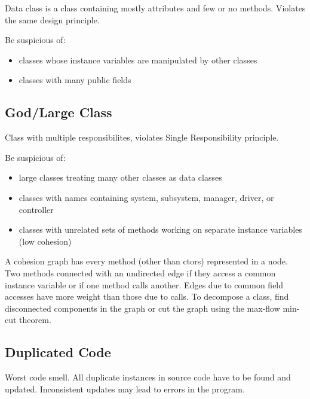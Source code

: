 \documentclass[11pt]{article}
\begin{document}
Data class is a class containing mostly attributes and few or no methods.
Violates the same design principle.

Be suspicious of:
\begin{itemize}
\item classes whose instance variables are manipulated by other classes
\item classes with many public fields
\end{itemize}
\subsection{God/Large Class}
\label{sec:org33de38a}
Class with multiple responsibilites, violates Single Responsibility principle.

Be suspicious of:
\begin{itemize}
\item large classes treating many other classes as data classes
\item classes with names containing system, subsystem, manager, driver, or controller
\item classes with unrelated sets of methods working on separate instance variables (low cohesion)
\end{itemize}

A cohesion graph has every method (other than ctors) represented in a node.
Two methods connected with an undirected edge if they access a common instance variable or if
one method calls another.
Edges due to common field accesses have more weight than those due to calls.
To decompose a class, find disconnected components in the graph or cut the graph using the
max-flow min-cut theorem.
\subsection{Duplicated Code}
\label{sec:org840e3f8}
Worst code smell.
All duplicate instances in source code have to be found and updated.
Inconsistent updates may lead to errors in the program.
\end{document}
